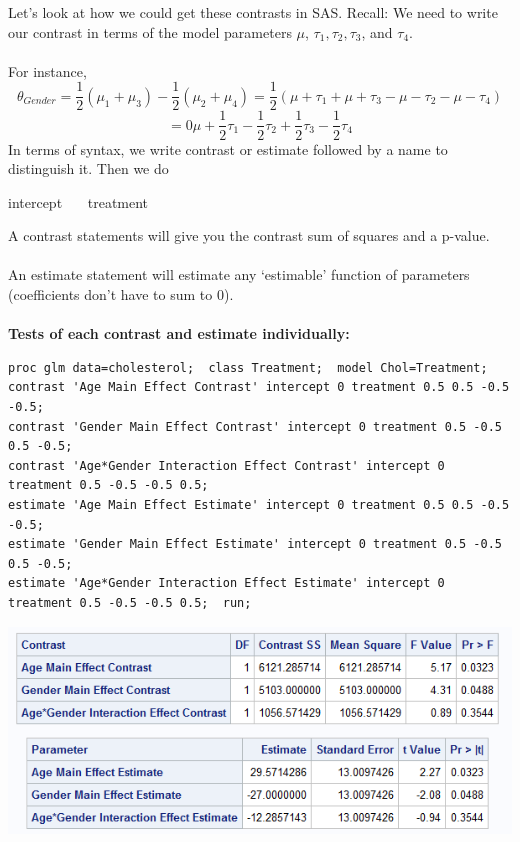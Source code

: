 Let's look at how we could get these contrasts in SAS.  Recall:  We need to write our contrast in terms of the model parameters $\mu$, $\tau_1, \tau_2,\tau_3$, and $\tau_4$. \\~\\
For instance, 
$$\theta_{Gender}=\frac{1}{2}(\mu_1+\mu_3)-\frac{1}{2}(\mu_2+\mu_4)=\frac{1}{2}(\mu+\tau_1+\mu+\tau_3-\mu-\tau_2-\mu-\tau_4)$$
$$=0\mu+\frac{1}{2}\tau_1-\frac{1}{2}\tau_2+\frac{1}{2}\tau_3-\frac{1}{2}\tau_4$$
In terms of syntax, we write contrast or estimate followed by a name to distinguish it.  Then we do
\begin{center}
intercept ~~~treatment ~~~~~~
\end{center}
A contrast statements will give you the contrast sum of squares and a p-value.\\~\\
An estimate statement will estimate any `estimable' function of parameters (coefficients don't have to sum to 0). \\~\\

\textbf{Tests of each contrast and estimate individually:}
\begin{small}
\begin{verbatim}
proc glm data=cholesterol;  class Treatment;  model Chol=Treatment;
contrast 'Age Main Effect Contrast' intercept 0 treatment 0.5 0.5 -0.5 -0.5;
contrast 'Gender Main Effect Contrast' intercept 0 treatment 0.5 -0.5 0.5 -0.5;
contrast 'Age*Gender Interaction Effect Contrast' intercept 0 treatment 0.5 -0.5 -0.5 0.5;
estimate 'Age Main Effect Estimate' intercept 0 treatment 0.5 0.5 -0.5 -0.5;
estimate 'Gender Main Effect Estimate' intercept 0 treatment 0.5 -0.5 0.5 -0.5;
estimate 'Age*Gender Interaction Effect Estimate' intercept 0 treatment 0.5 -0.5 -0.5 0.5;  run;
\end{verbatim}
\end{small}

\begin{flushleft}
\includegraphics[scale=0.75]{CholContrasts}
\end{flushleft}

